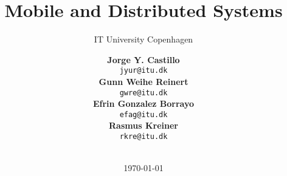\documentclass[11pt,a4paper,oneside]{scrbook}
\begin{document}
\title{Mobile and Distributed Systems}
\subtitle{IT University Copenhagen}
\author{\textbf{Jorge Y. Castillo}\\
	    \texttt{\color{red}jyur@itu.dk}\\
  \textbf{Gunn Weihe Reinert}\\
	\texttt{\color{red}gwre@itu.dk}\\
  \textbf{Efrin Gonzalez Borrayo}\\
	\texttt{\color{red}efag@itu.dk}\\
  \textbf{Rasmus Kreiner}\\
	\texttt{\color{red}rkre@itu.dk}\\
  \\
  }
\date{\today}
\maketitle


\end{document}
